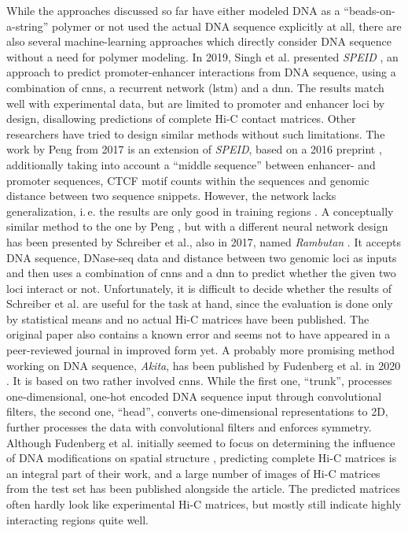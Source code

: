 While the approaches discussed so far have either modeled DNA as a ``beads-on-a-string'' polymer or not used the actual DNA sequence explicitly at all,
there are also several machine-learning approaches which directly consider DNA sequence without a need for polymer modeling.
In 2019, Singh et al. presented \emph{SPEID} \cite{Singh2019}, an approach to predict promoter-enhancer interactions from DNA sequence,
using a combination of \acrshort{cnn}s, a recurrent network (\acrshort{lstm}) and a \acrshort{dnn}.
The results match well with experimental data, but are limited to promoter and enhancer loci by design, disallowing predictions of complete Hi-C contact matrices.
Other researchers have tried to design similar methods without such limitations.
The work by Peng from 2017 \cite{peng2017} is an extension of \emph{SPEID}, based on a 2016 preprint \cite{Singh2016}, 
additionally taking into account a ``middle sequence'' between enhancer- and promoter sequences,
CTCF motif counts within the sequences and genomic distance between two sequence snippets. 
However, the network lacks generalization, i.\,e. the results are only good in training regions \cite[figs. 4, 5]{peng2017}.
A conceptually similar method to the one by Peng \cite{peng2017}, but with a different neural network design has been presented by Schreiber et al., also in 2017, 
named \emph{Rambutan} \cite{Schreiber2017}.
It accepts DNA sequence, DNase-seq data and distance between two genomic loci as inputs 
and then uses a combination of \acrshort{cnn}s and a \acrshort{dnn} to predict whether the given two loci interact or not. 
Unfortunately, it is difficult to decide whether the results of Schreiber et al. are useful for the task at hand, since the evaluation is done only by statistical means 
and no actual Hi-C matrices have been published.
The original paper \cite{Schreiber2017} also contains a known error and seems not to have appeared in a peer-reviewed journal in improved form 
yet. 
A probably more promising method working on DNA sequence, \emph{Akita}, has been published by Fudenberg et al. in 2020 \cite{Fudenberg2020}.
It is based on two rather involved \acrlong{cnn}s. 
While the first one, ``trunk'', processes one-dimensional, one-hot encoded DNA sequence input through convolutional filters, the second one, ``head'', 
converts one-dimensional representations to 2D, further processes the data with convolutional filters and enforces symmetry.
Although Fudenberg et al. initially seemed to focus on determining the influence of DNA modifications on spatial structure \cite{Fudenberg2019},
predicting complete Hi-C matrices is an integral part of their work, 
and a large number of images of Hi-C matrices from the test set has been published alongside the article. 
The predicted matrices often hardly look like experimental Hi-C matrices, but mostly still indicate highly interacting regions quite well.

